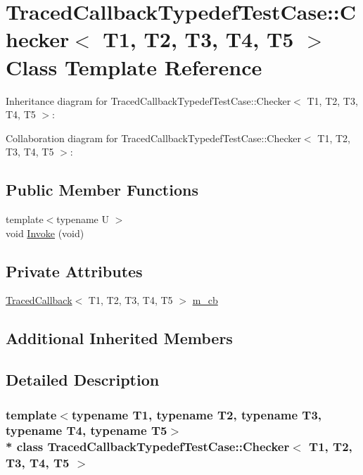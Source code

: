 \hypertarget{classTracedCallbackTypedefTestCase_1_1Checker}{}\section{Traced\+Callback\+Typedef\+Test\+Case\+:\+:Checker$<$ T1, T2, T3, T4, T5 $>$ Class Template Reference}
\label{classTracedCallbackTypedefTestCase_1_1Checker}


Inheritance diagram for Traced\+Callback\+Typedef\+Test\+Case\+:\+:Checker$<$ T1, T2, T3, T4, T5 $>$\+:


Collaboration diagram for Traced\+Callback\+Typedef\+Test\+Case\+:\+:Checker$<$ T1, T2, T3, T4, T5 $>$\+:
\subsection*{Public Member Functions}
\begin{DoxyCompactItemize}
\item 
{\footnotesize template$<$typename U $>$ }\\void \hyperlink{classTracedCallbackTypedefTestCase_1_1Checker_a564cf1ac68de1199f7b1731e8cbec053}{Invoke} (void)
\end{DoxyCompactItemize}
\subsection*{Private Attributes}
\begin{DoxyCompactItemize}
\item 
\hyperlink{classns3_1_1TracedCallback}{Traced\+Callback}$<$ T1, T2, T3, T4, T5 $>$ \hyperlink{classTracedCallbackTypedefTestCase_1_1Checker_a5c76802d9ac80fcfcc60c0238cc5f7cc}{m\+\_\+cb}
\end{DoxyCompactItemize}
\subsection*{Additional Inherited Members}


\subsection{Detailed Description}
\subsubsection*{template$<$typename T1, typename T2, typename T3, typename T4, typename T5$>$\\*
class Traced\+Callback\+Typedef\+Test\+Case\+::\+Checker$<$ T1, T2, T3, T4, T5 $>$}

